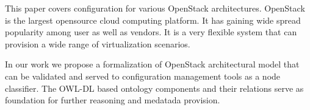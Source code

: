 
This paper covers configuration for various OpenStack architectures. OpenStack is the largest opensource cloud computing platform. It has gaining wide spread popularity among user as well as vendors. It is a very flexible system that can provision a wide range of virtualization scenarios.

In our work we propose a formalization of OpenStack architectural model that can be validated and served to configuration management tools as a node classifier. The OWL-DL based ontology components and their relations serve as foundation for further reasoning and medatada provision.
